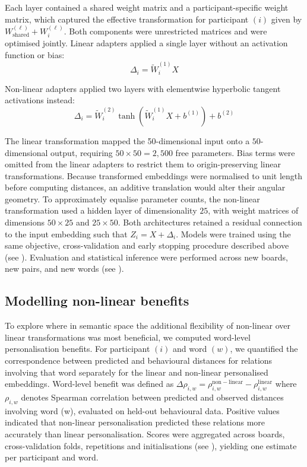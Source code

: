 \documentclass[pdflatex,sn-mathphys]{sn-jnl}
\begin{document}
Each layer contained a shared weight matrix and a participant-specific weight matrix, which captured the effective transformation for participant $(i)$ given by $W_{\mathrm{shared}}^{(\ell)} + W_i^{(\ell)}$. Both components were unrestricted matrices and were optimised jointly. Linear adapters applied a single layer without an activation function or bias:
\begin{equation*}
    \Delta_i = \widetilde W_i^{(1)}X
\end{equation*}

Non-linear adapters applied two layers with elementwise hyperbolic tangent activations instead:
\begin{equation*}
    \Delta_i = \widetilde W_i^{(2)} \tanh\left(\widetilde W_i^{(1)}X + b^{(1)}\right) + b^{(2)}
\end{equation*}

The linear transformation mapped the 50-dimensional input onto a $50$-dimensional output, requiring $50\times 50=2,500$ free parameters. Bias terms were omitted from the linear adapters to restrict them to origin-preserving linear transformations. Because transformed embeddings were normalised to unit length before computing distances, an additive translation would alter their angular geometry. To approximately equalise parameter counts, the non-linear transformation used a hidden layer of dimensionality $25$, with weight matrices of dimensions $50\times 25$ and $25\times 50$. Both architectures retained a residual connection to the input embedding such that $Z_i = X + \Delta_i$. Models were trained using the same objective, cross-validation and early stopping procedure described above (see ). Evaluation and statistical inference were performed across new boards, new pairs, and new words (see ).

\subsection{Modelling non-linear benefits}\label{nonlinear-words}
To explore where in semantic space the additional flexibility of non-linear over linear transformations was most beneficial, we computed word-level personalisation benefits. For participant $(i)$ and word $(w)$, we quantified the correspondence between predicted and behavioural distances for relations involving that word separately for the linear and non-linear personalised embeddings. Word-level benefit was defined as $\Delta\rho_{i,w} = \rho_{i,w}^{\mathrm{non-linear}} - \rho_{i,w}^{\mathrm{linear}}$ where $\rho_{i,w}$ denotes Spearman correlation between predicted and observed distances involving word (w), evaluated on held-out behavioural data. Positive values indicated that non-linear personalisation predicted these relations more accurately than linear personalisation. Scores were aggregated across boards, cross-validation folds, repetitions and initialisations (see ), yielding one estimate per participant and word.
\end{document}
